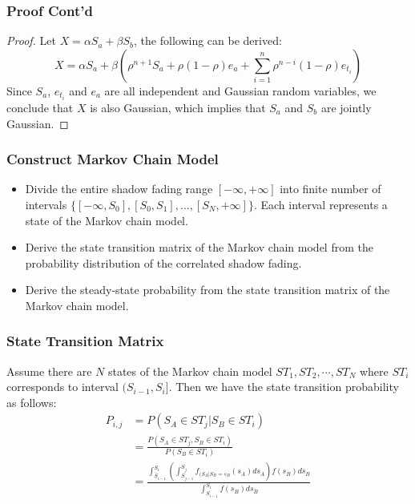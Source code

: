 \documentclass{beamer}
\begin{document}
\begin{frame}
\frametitle{Proof Cont'd}
\begin{proof}
Let $X=\alpha S_{a}+\beta S_{b}$, the following can be derived:
\begin{equation}
X=\alpha S_{a}+\beta(\rho^{n+1}S_{a}+\rho(1-\rho)e_{a}+\sum_{i=1}^{n}\rho^{n-i}(1-\rho)e_{t_{i}})
\end{equation}
Since $S_{a}$, $e_{t_{i}}$ and $e_{a}$ are all independent and Gaussian random variables, we conclude that $X$ is also Gaussian, which implies that $S_{a}$ and $S_{b}$ are jointly Gaussian.
\end{proof}
\end{frame}

\begin{frame}
\frametitle{Construct Markov Chain Model}
\begin{itemize}
\item Divide the entire shadow fading range $[-\infty,+\infty]$ into finite number of intervals $\{[-\infty,S_{0}],[S_{0},S_{1}],\dots,[S_{N},+\infty]\}$. Each interval represents a state of the Markov chain model.
\item Derive the state transition matrix of the Markov chain model from the probability distribution of the correlated shadow fading.
\item Derive the steady-state probability from the state transition matrix of the Markov chain model.
\end{itemize}
\end{frame}
%
\begin{frame}
\frametitle{State Transition Matrix}
Assume there are $N$ states of the Markov chain model $ST_{1}, ST_{2},\cdots, ST_{N}$ where $ST_{i}$ corresponds to interval $(S_{i-1}, S_{i}]$. Then we have the state transition probability as follows:
\begin{equation}
\label{statetransition}
\begin{split}
P_{i,j} &= P(S_{A}\in ST_{j}|S_{B}\in ST_{i})\\
&=\frac{P(S_{A}\in ST_{j}, S_{B}\in ST_{i})}{P(S_{B}\in ST_{i})}\\
&=\frac{\int_{S_{i-1}}^{S_{i}}(\int_{S_{j-1}}^{S_{j}}f_{(S_{A}|S_{B}=s_{B}}(s_{A})ds_{A})f(s_{B})ds_{B}}{\int_{S_{i-1}}^{S_{i}}f(s_{B})ds_{B}}
\end{split}
\end{equation}
\end{frame}
%
\end{document}

